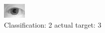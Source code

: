 \begin{figure}[h!]
\begin{center}
\includegraphics[width=0.60\columnwidth]{figures/ID1127_class_2_target_3.png}
\end{center}
\caption{ Classification: 2 actual target: 3}
\label{fig:ID1127_class_2_target_3}
\end{figure}
